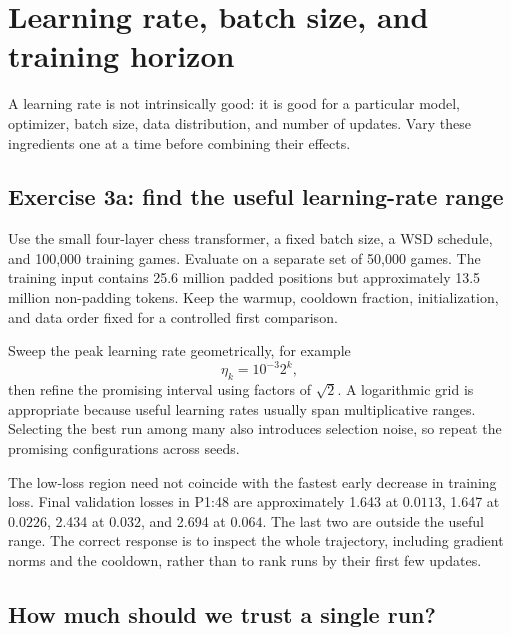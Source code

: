 \chapter{Learning rate, batch size, and training horizon}
\label{ch:hyperparameters}

A learning rate is not intrinsically good: it is good for a particular model, optimizer, batch size, data distribution, and number of updates. Vary these ingredients one at a time before combining their effects.

\section{Exercise 3a: find the useful learning-rate range}
Use the small four-layer chess transformer, a fixed batch size, a WSD schedule, and 100,000 training games. Evaluate on a separate set of 50,000 games. The training input contains 25.6 million padded positions but approximately 13.5 million non-padding tokens. Keep the warmup, cooldown fraction, initialization, and data order fixed for a controlled first comparison.

Sweep the peak learning rate geometrically, for example
\[
\eta_k=10^{-3}2^k,
\]
then refine the promising interval using factors of $\sqrt{2}$. A logarithmic grid is appropriate because useful learning rates usually span multiplicative ranges. Selecting the best run among many also introduces selection noise, so repeat the promising configurations across seeds.


The low-loss region need not coincide with the fastest early decrease in training loss. Final validation losses in P1:48 are approximately 1.643 at $0.0113$, 1.647 at $0.0226$, 2.434 at $0.032$, and 2.694 at $0.064$. The last two are outside the useful range. The correct response is to inspect the whole trajectory, including gradient norms and the cooldown, rather than to rank runs by their first few updates.

\section{How much should we trust a single run?}

